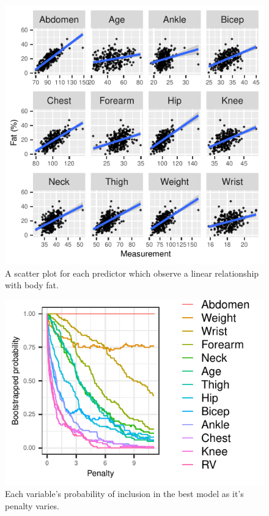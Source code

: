 \documentclass[letterpaper,9pt,twocolumn,twoside,]{pinp}
\begin{document}
\begin{figure}

{\centering \includegraphics{template_report_files/figure-latex/linear-other-1} 

}

\caption{\label{lin:o} A scatter plot for each predictor which observe a linear relationship with body fat.}\label{fig:linear-other}
\end{figure}

\begin{figure}

{\centering \includegraphics{template_report_files/figure-latex/unnamed-chunk-5-1} 

}

\caption{\label{mplot:inc} Each variable's probability of inclusion in the best model as it's penalty varies.}\label{fig:unnamed-chunk-5}
\end{figure}
\end{document}
